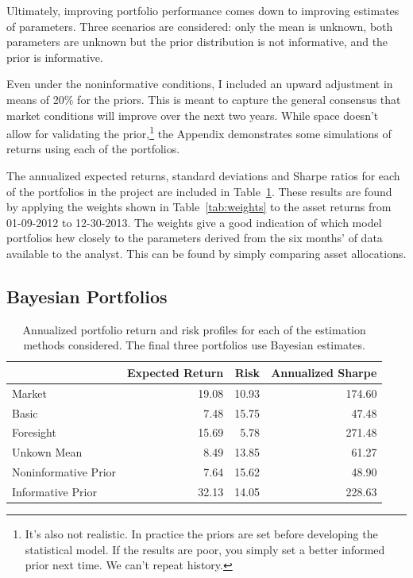 \documentclass[a4paper]{article}\usepackage[]{graphicx}\usepackage[]{color}
\begin{document}
Ultimately, improving portfolio performance comes down to improving estimates of parameters. Three scenarios are considered: only the mean is unknown, both parameters are unknown but the prior distribution is not informative, and the prior is informative.

Even under the noninformative conditions, I included an upward adjustment in means of 20\% for the priors. This is meant to capture the general consensus that market conditions will improve over the next two years. While space doesn't allow for validating the prior,\footnote{It's also not realistic. In practice the priors are set before developing the statistical model. If the results are poor, you simply set a better informed prior next time. We can't repeat history.} the Appendix demonstrates some simulations of returns using each of the portfolios. 

The annualized expected returns, standard deviations and Sharpe ratios for each of the portfolios in the project are included in Table~\ref{tab:results}. These results are found by applying the weights shown in Table~\ref{tab:weights} to the asset returns from 01-09-2012 to 12-30-2013. The weights give a good indication of which model portfolios hew closely to the parameters derived from the six months' of data available to the analyst. This can be found by simply comparing asset allocations.

\subsection{Bayesian Portfolios}

\begin{table}[ht]
\centering
\begin{tabular}{lrrr}
  \hline
 & Expected Return & Risk & Annualized Sharpe \\ 
  \hline
Market & 19.08 & 10.93 & 174.60 \\ 
  Basic & 7.48 & 15.75 & 47.48 \\ 
  Foresight & 15.69 & 5.78 & 271.48 \\ 
  Unkown Mean & 8.49 & 13.85 & 61.27 \\ 
  Noninformative Prior & 7.64 & 15.62 & 48.90 \\ 
  Informative Prior & 32.13 & 14.05 & 228.63 \\ 
   \hline
\end{tabular}
\caption{Annualized portfolio return and risk profiles for each of the estimation methods considered. The final three portfolios use Bayesian estimates.} 
\label{tab:results}
\end{table}
\end{document}
